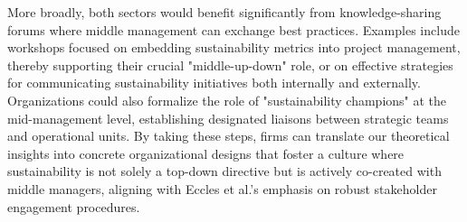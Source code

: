	More broadly, both sectors would benefit significantly from knowledge-sharing forums where middle management can exchange best practices. Examples include workshops focused on embedding sustainability metrics into project management, thereby supporting their crucial "middle-up-down" role, or on effective strategies for communicating sustainability initiatives both internally and externally. Organizations could also formalize the role of "sustainability champions" at the mid-management level, establishing designated liaisons between strategic teams and operational units. By taking these steps, firms can translate our theoretical insights into concrete organizational designs that foster a culture where sustainability is not solely a top-down directive but is actively co-created with middle managers, aligning with Eccles et al.'s emphasis on robust stakeholder engagement procedures. \\
	
